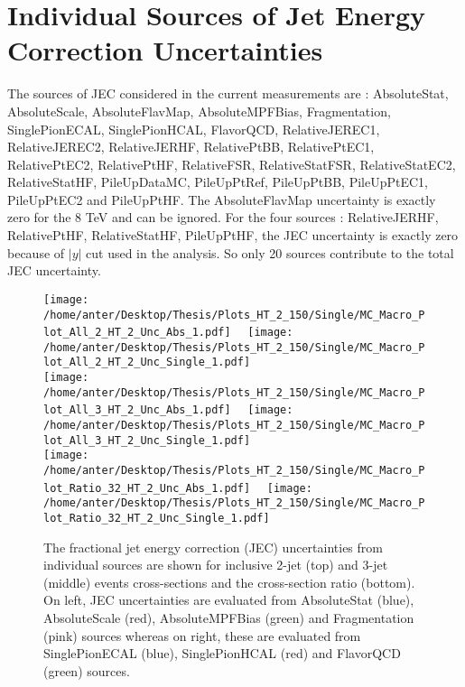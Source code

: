 \section{Individual Sources of Jet Energy Correction Uncertainties}
\label{sec:JECs}
{\fontsize{12pt}{12pt}\selectfont The sources of JEC considered in the current measurements are : AbsoluteStat, AbsoluteScale, AbsoluteFlavMap, AbsoluteMPFBias, Fragmentation, SinglePionECAL, SinglePionHCAL, FlavorQCD, RelativeJEREC1, RelativeJEREC2, RelativeJERHF, RelativePtBB, RelativePtEC1, RelativePtEC2, RelativePtHF, RelativeFSR, RelativeStatFSR, RelativeStatEC2, RelativeStatHF, PileUpDataMC, PileUpPtRef, PileUpPtBB, PileUpPtEC1, PileUpPtEC2 and PileUpPtHF. The AbsoluteFlavMap uncertainty is exactly zero for the 8 TeV and can be ignored. For the four sources : RelativeJERHF, RelativePtHF, RelativeStatHF, PileUpPtHF, the JEC uncertainty is exactly zero because of $|y|$  cut used in the analysis. So only 20 sources contribute to the total JEC uncertainty.} 

\begin{figure}[!hbtp]
\hspace*{-5mm}\texttt{[image: /home/anter/Desktop/Thesis/Plots\_HT\_2\_150/Single/MC\_Macro\_Plot\_All\_2\_HT\_2\_Unc\_Abs\_1.pdf]}%
~~\texttt{[image: /home/anter/Desktop/Thesis/Plots\_HT\_2\_150/Single/MC\_Macro\_Plot\_All\_2\_HT\_2\_Unc\_Single\_1.pdf]}\\
\hspace*{-5mm}\texttt{[image: /home/anter/Desktop/Thesis/Plots\_HT\_2\_150/Single/MC\_Macro\_Plot\_All\_3\_HT\_2\_Unc\_Abs\_1.pdf]}%
~~\texttt{[image: /home/anter/Desktop/Thesis/Plots\_HT\_2\_150/Single/MC\_Macro\_Plot\_All\_3\_HT\_2\_Unc\_Single\_1.pdf]}\\
\hspace*{-5mm}\texttt{[image: /home/anter/Desktop/Thesis/Plots\_HT\_2\_150/Single/MC\_Macro\_Plot\_Ratio\_32\_HT\_2\_Unc\_Abs\_1.pdf]}%
~~\texttt{[image: /home/anter/Desktop/Thesis/Plots\_HT\_2\_150/Single/MC\_Macro\_Plot\_Ratio\_32\_HT\_2\_Unc\_Single\_1.pdf]}
\caption[The fractional jet energy correction (JEC) uncertainties from individual sources (Part I).]{The fractional jet energy correction (JEC) uncertainties from individual sources are shown for inclusive 2-jet (top) and 3-jet (middle) events cross-sections and the cross-section ratio \ratio (bottom). On left, JEC uncertainties are evaluated from AbsoluteStat (blue), AbsoluteScale (red), AbsoluteMPFBias (green) and Fragmentation (pink) sources whereas on right, these are evaluated from SinglePionECAL (blue), SinglePionHCAL (red) and FlavorQCD (green) sources.}
\label{fig:jes1}
\end{figure}

